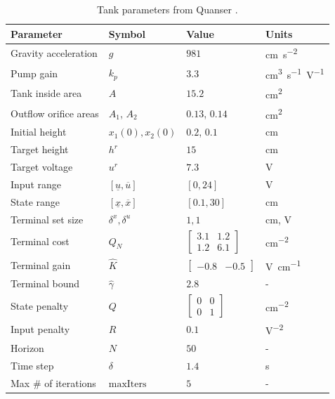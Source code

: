 \documentclass[letterpaper, 10 pt, conference]{ieeeconf}
\begin{document}
\begin{table}[ht]

\centering
\begin{tabular}{llll}
\hline
\textbf{Parameter} & \textbf{Symbol} & \textbf{Value} & \textbf{Units} \\ \hline
Gravity acceleration     &    $g$    &   $981$    &    \si{cm.s^{-2}}   \\ \hline
Pump gain &   $k_p$     &    $3.3$   &    \si{cm^3 s^{-1} V^{-1}}   \\ \hline
Tank inside area &   $A$     &    $15.2$   &    \si{cm^2}   \\ \hline
Outflow orifice areas &   $A_1$, $A_2$     &    $0.13$, $0.14$   &    \si{cm^2}   \\ \hline
Initial height &   $x_1(0), x_2(0)$     &    $0.2$, $0.1$   &    \si{cm} \\ \hline
Target height &   $h^r$   &    $15$   &  \si{cm}  \\ \hline
Target voltage &   $u^r$   &    $7.3$   &  \si{V}  \\ \hline
Input range &   $\left[\underline{u}, \overline{u}\right]$   &   $\left[0, 24\right]$   &    \si{V}  \\ \hline
State range &   $\left[\underline{x}, \overline{x}\right]$   &   $\left[0.1, 30 \right]$   &    \si{cm}  \\ \hline
Terminal set size &   $\delta^x, \delta^u$   &   $1, 1$   &   \si{cm}, \si{V}  \\ \hline
Terminal cost &   $Q_N$   &   $\begin{bmatrix} 3.1  & 1.2\\ 1.2  & 6.1 \end{bmatrix}$   &  \si{cm^{-2}}  \\ \hline
Terminal gain &   $\hat{K}$   &   $\begin{bmatrix} -0.8 & -0.5\end{bmatrix}$   &  \si{V cm^{-1}}  \\ \hline
Terminal bound &   $\hat{\gamma}$   &   $2.8$   &  \si{-}  \\ \hline
State penalty &   $Q$   &   $\begin{bmatrix} 0  & 0\\ 0  & 1 \end{bmatrix}$   &    \si{cm^{-2}}  \\ \hline
Input penalty &   $R$   &   $0.1$   &    \si{V^{-2}}  \\ \hline
Horizon &   $N$   &   $50$   &    \si{-}  \\ \hline
Time step &   $\delta$   &   $1.4$   &    \si{s}  \\ \hline
Max \# of iterations &   $\text{maxIters}$   &   $5$   &    \si{-}  \\ \hline
\end{tabular}
\vspace{1mm}\caption{Tank parameters from Quanser \cite{Quanser}.}
\label{tab:param}
\vspace{-3mm}
\end{table}
\end{document}
